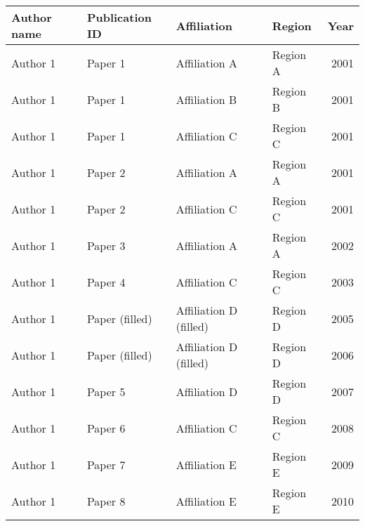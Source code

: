 \begin{tabular}{llllr}
\hline
 Author name   & Publication ID   & Affiliation            & Region   &   Year \\
\hline
 Author 1      & Paper 1          & Affiliation A          & Region A &   2001 \\
 Author 1      & Paper 1          & Affiliation B          & Region B &   2001 \\
 Author 1      & Paper 1          & Affiliation C          & Region C &   2001 \\
 Author 1      & Paper 2          & Affiliation A          & Region A &   2001 \\
 Author 1      & Paper 2          & Affiliation C          & Region C &   2001 \\
 Author 1      & Paper 3          & Affiliation A          & Region A &   2002 \\
 Author 1      & Paper 4          & Affiliation C          & Region C &   2003 \\
 Author 1      & Paper (filled)   & Affiliation D (filled) & Region D &   2005 \\
 Author 1      & Paper (filled)   & Affiliation D (filled) & Region D &   2006 \\
 Author 1      & Paper 5          & Affiliation D          & Region D &   2007 \\
 Author 1      & Paper 6          & Affiliation C          & Region C &   2008 \\
 Author 1      & Paper 7          & Affiliation E          & Region E &   2009 \\
 Author 1      & Paper 8          & Affiliation E          & Region E &   2010 \\
\hline
\end{tabular}